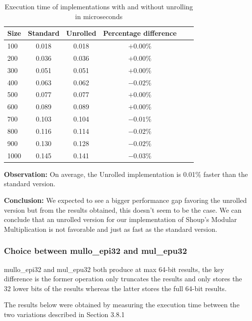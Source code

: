 \documentclass{article}
\begin{document}
\begin{table}[H]
    \centering
    \begin{tabular}{|l|c|c|c|c|c|}
        \hline
        Size & Standard & Unrolled & Percentage difference \\ \hline
        100  & 0.018    & 0.018    & $+0.00\%$             \\
        200  & 0.036    & 0.036    & $+0.00\%$             \\
        300  & 0.051    & 0.051    & $+0.00\%$             \\
        400  & 0.063    & 0.062    & $-0.02\%$             \\
        500  & 0.077    & 0.077    & $+0.00\%$             \\
        600  & 0.089    & 0.089    & $+0.00\%$             \\
        700  & 0.103    & 0.104    & $-0.01\%$             \\
        800  & 0.116    & 0.114    & $-0.02\%$             \\
        900  & 0.130    & 0.128    & $-0.02\%$             \\
        1000 & 0.145    & 0.141    & $-0.03\%$             \\
        \hline
    \end{tabular}
    \caption{Execution time of implementations with and without unrolling in microseconds}
\end{table}

\textbf{Observation: }On average, the Unrolled implementation is 0.01\% faster
than the standard version.

\textbf{Conclusion:} We expected to see a bigger performance gap favoring the unrolled version but from the results obtained, this doesn't seem to be the case. We can conclude that an unrolled version for our implementation of Shoup's Modular Multiplication is not favorable and just as fast as the standard version.


\subsubsection{Choice between mullo\_epi32 and mul\_epu32}
mullo\_epi32 and mul\_epu32 both produce at max 64-bit results, the key difference is the former operation only truncates the results and only stores the
32 lower bits of the results whereas the latter stores the full 64-bit results.

The results below were obtained by measuring the execution time between the two variations described in Section 3.8.1
\end{document}
